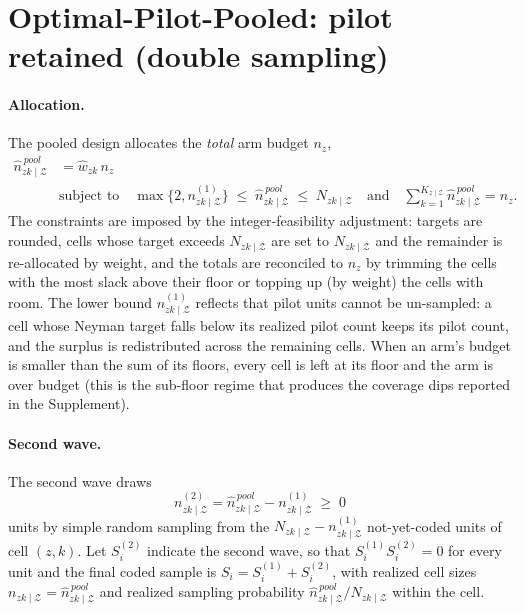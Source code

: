 \documentclass[12pt]{article}
\theoremstyle{remark}
\newcommand{\NzkZ}{N_{zk \mid\mathcal{Z}}}
\newcommand{\nzkZ}{n_{zk \mid\mathcal{Z}}}
\newcommand{\npzkZ}{n^{(1)}_{zk \mid \mathcal{Z}}}
\newcommand{\nszkZ}{n^{(2)}_{zk \mid \mathcal{Z}}}
\newcommand{\npoolzkZ}{\hat{n}^{\,pool}_{zk \mid \mathcal{Z}}}
\begin{document}
\section{Optimal-Pilot-Pooled: pilot retained (double sampling)}
\label{sec:pooled}

\paragraph{Allocation.} The pooled design allocates the \emph{total} arm budget $n_z$,
\begin{equation}
\label{eq:pilot_alloc_pool}
\begin{aligned}
\npoolzkZ &= \hat{w}_{zk}\, n_z \\
&\text{subject to} \quad
\max\{2, \npzkZ\} \;\le\; \npoolzkZ \;\le\; \NzkZ
\quad \text{and} \quad
\sum_{k=1}^{K_{z \mid \mathcal{Z}}} \npoolzkZ = n_z .
\end{aligned}
\end{equation}
The constraints are imposed by the integer-feasibility adjustment: targets are rounded, cells whose target exceeds $\NzkZ$ are set to $\NzkZ$ and the remainder is re-allocated by weight, and the totals are reconciled to $n_z$ by trimming the cells with the most slack above their floor or topping up (by weight) the cells with room. The lower bound $\npzkZ$ reflects that pilot units cannot be un-sampled: a cell whose Neyman target falls below its realized pilot count keeps its pilot count, and the surplus is redistributed across the remaining cells. When an arm's budget is smaller than the sum of its floors, every cell is left at its floor and the arm is over budget (this is the sub-floor regime that produces the coverage dips reported in the Supplement).

\paragraph{Second wave.} The second wave draws
\begin{equation}
\label{eq:wave2_pool}
\nszkZ = \npoolzkZ - \npzkZ \;\ge\; 0
\end{equation}
units by simple random sampling from the $\NzkZ - \npzkZ$ not-yet-coded units of cell $(z,k)$. Let $S^{(2)}_i$ indicate the second wave, so that $S^{(1)}_i S^{(2)}_i = 0$ for every unit and the final coded sample is $S_i = S^{(1)}_i + S^{(2)}_i$, with realized cell sizes $\nzkZ = \npoolzkZ$ and realized sampling probability $\npoolzkZ / \NzkZ$ within the cell.
\end{document}
